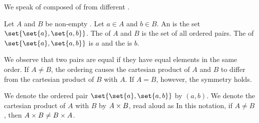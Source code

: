
\sbasic



\sstart



We speak of
composed of
from different
.


Let $A$ and $B$ be
non-empty
.
Let $a \in A$ and
$b \in B$.
An
is the set
$\set{\set{a}, \set{a, b}}$.
The
of $A$ and $B$ is the set
of all ordered pairs.
The 
of $\set{\set{a}, \set{a, b}}$
is $a$ and
the 
is $b$.


We observe that two pairs
are equal if they have equal
elements in the same order.
If $A \neq B$,
the ordering causes
the cartesian product of
$A$ and $B$
to differ from
the cartesian product of
$B$ with $A$.
If $A = B$, however, the
symmetry holds.

We denote the ordered pair
$\set{\set{a},\set{a,b}}$
by $(a, b)$.
We denote the cartesian product
of $A$ with $B$ by
$A \times B$, read aloud as
In this notation,
if $A \neq B$, then
$A \times B \neq B \times A$.

\strats
